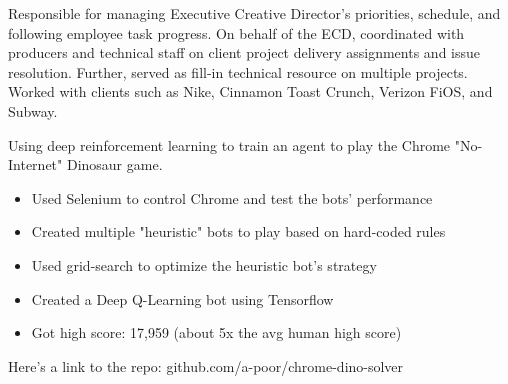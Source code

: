 \documentclass[8pt,letter,ragged2e]{altacv}
\begin{document}
Responsible for managing Executive Creative Director's priorities, schedule, and following employee task progress. On behalf of the ECD, coordinated with producers and technical staff on client project delivery assignments and issue resolution. Further, served as fill-in technical resource on multiple projects. Worked with clients such as Nike, Cinnamon Toast Crunch, Verizon FiOS, and Subway.

\vspace{10px}


Using deep reinforcement learning to train an agent to play the Chrome "No-Internet" Dinosaur game.
\begin{itemize}
    \item Used Selenium to control Chrome and test the bots' performance
    \item Created multiple "heuristic" bots to play based on hard-coded rules
    \item Used grid-search to optimize the heuristic bot's strategy
    \item Created a Deep Q-Learning bot using Tensorflow
    \item Got high score: 17,959 (about 5x the avg human high score)
\end{itemize}
Here's a link to the repo: github.com/a-poor/chrome-dino-solver
\vspace{2px}
\end{document}
